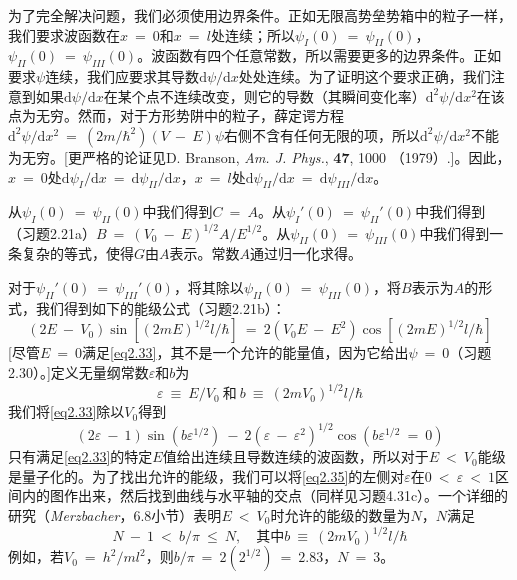 \documentclass[12pt,a4paper,openany]{ctexbook}
\begin{document}
\begin{flushleft}
为了完全解决问题，我们必须使用边界条件。正如无限高势垒势箱中的粒子一样，我们要求波函数在$x\ =\ 0$和$x\ =\ l$处连续；所以$\psi_I(0)\ =\ \psi_{II}(0)$，$\psi_{II}(0)\ =\ \psi_{III}(0)$。波函数有四个任意常数，所以需要更多的边界条件。正如要求$\psi$连续，我们应要求其导数$\mathrm{d}\psi/\mathrm{d}x$处处连续。为了证明这个要求正确，我们注意到如果$\mathrm{d}\psi/\mathrm{d}x$在某个点不连续改变，则它的导数（其瞬间变化率）$\mathrm{d}^2\psi/\mathrm{d}x^2$在该点为无穷。然而，对于方形势阱中的粒子，薛定谔方程$\mathrm{d}^2\psi/\mathrm{d}x^2\ =\ (2m/\hbar^2)(V\ -\ E)\psi$右侧不含有任何无限的项，所以$\mathrm{d}^2\psi/\mathrm{d}x^2$不能为无穷。[更严格的论证见D. Branson, \textit{Am. J. Phys.}, \textbf{47}, 1000 （1979）.]。因此，$x\ =\ 0$处$\mathrm{d}\psi_I/\mathrm{d}x\ =\ \mathrm{d}\psi_{II}/\mathrm{d}x$，$x\ =\ l$处$\mathrm{d}\psi_{II}/\mathrm{d}x\ =\ \mathrm{d}\psi_{III}/\mathrm{d}x$。

从$\psi_I(0)\ =\ \psi_{II}(0)$中我们得到$C\ =\ A$。从$\psi_I'(0)\ =\ \psi_{II}'(0)$中我们得到（习题2.21a）$B\ =\ (V_0\ -\ E)^{1/2}A/E^{1/2}$。从$\psi_{II}(0)\ =\ \psi_{III}(0)$中我们得到一条复杂的等式，使得$G$由$A$表示。常数$A$通过归一化求得。

对于$\psi_{II}'(0)\ =\ \psi_{III}'(0)$，将其除以$\psi_{II}(0)\ =\ \psi_{III}(0)$，将$B$表示为$A$的形式，我们得到如下的能级公式（习题2.21b）：
\begin{equation}
    (2E\ -\ V_0)\sin[(2mE)^{1/2}l/\hbar]\ =\ 2(V_0E\ -\ E^2)\cos[(2mE)^{1/2}l/\hbar]
    \label{eq2.33}
\end{equation}
[尽管$E\ =\ 0$满足\eqref{eq2.33}，其不是一个允许的能量值，因为它给出$\psi\ =\ 0$（习题2.30）。]定义无量纲常数$\varepsilon$和$b$为
\begin{equation}
    \varepsilon\ \equiv\ E/V_0\ \text{和}\ b\ \equiv\ (2mV_0)^{1/2}l/\hbar
\end{equation}
我们将\eqref{eq2.33}除以$V_0$得到
\begin{equation}
    (2\varepsilon\ -\ 1)\sin(b\varepsilon^{1/2})\ -\ 2(\varepsilon\ -\ \varepsilon^2)^{1/2}\cos(b\varepsilon^{1/2}\ =\ 0)
    \label{eq2.35}
\end{equation}
只有满足\eqref{eq2.33}的特定$E$值给出连续且导数连续的波函数，所以对于$E\ <\ V_0$能级是量子化的。为了找出允许的能级，我们可以将\eqref{eq2.35}的左侧对$\varepsilon$在$0\ <\ \varepsilon\ <\ 1$区间内的图作出来，然后找到曲线与水平轴的交点（同样见习题4.31c）。一个详细的研究（\textit{Merzbacher}，6.8小节）表明$E\ <\ V_0$时允许的能级的数量为$N$，$N$满足
\begin{equation}
    N\ -\ 1\ <\ b/\pi\ \leq\ N,\quad\text{其中}b\ \equiv\ (2mV_0)^{1/2}l/\hbar
    \label{eq2.36}
\end{equation}
例如，若$V_0\ =\ h^2/ml^2$，则$b/\pi\ =\ 2(2^{1/2})\ =\ 2.83$，$N\ =\ 3$。


\end{flushleft}
\end{document}
